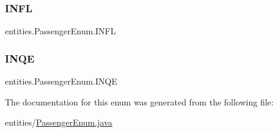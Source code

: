 \subsubsection{\texorpdfstring{I\+N\+FL}{INFL}}
{\footnotesize\ttfamily entities.\+Passenger\+Enum.\+I\+N\+FL}

\mbox{\label{enumentities_1_1_passenger_enum_a25ddab644876bff4f8aa3698c3387f64}} 
\subsubsection{\texorpdfstring{I\+N\+QE}{INQE}}
{\footnotesize\ttfamily entities.\+Passenger\+Enum.\+I\+N\+QE}



The documentation for this enum was generated from the following file\+:\begin{DoxyCompactItemize}
\item 
entities/\hyperlink{_passenger_enum_8java}{Passenger\+Enum.\+java}\end{DoxyCompactItemize}

